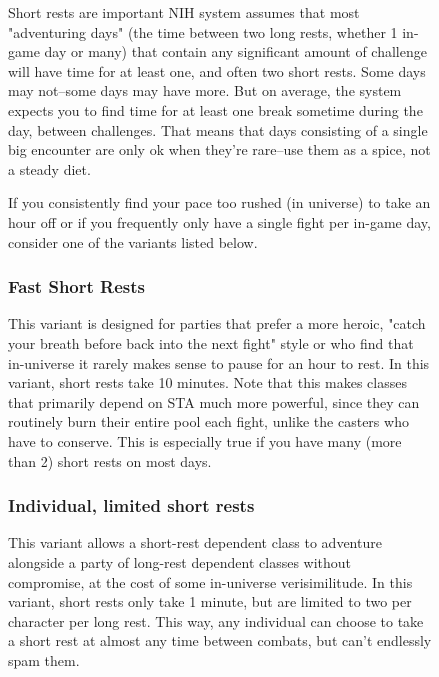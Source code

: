 \begin{figure}
    \begin{DndSidebar}{Short rests are important}
        NIH system assumes that most "adventuring days" (the time between two long rests, whether 1 in-game day or many) that contain any significant amount of challenge will have time for at least one, and often two short rests. Some days may not--some days may have more. But on average, the system expects you to find time for at least one break sometime during the day, between challenges. That means that days consisting of a single big encounter are only ok when they're rare--use them as a spice, not a steady diet.

        If you consistently find your pace too rushed (in universe) to take an hour off or if you frequently only have a single fight per in-game day, consider one of the variants listed below.
        \subsubsection{Fast Short Rests}

        This variant is designed for parties that prefer a more heroic, "catch your breath before back into the next fight" style or who find that in-universe it rarely makes sense to pause for an hour to rest. In this variant, short rests take 10 minutes. Note that this makes classes that primarily depend on STA much more powerful, since they can routinely burn their entire pool each fight, unlike the casters who have to conserve. This is especially true if you have many (more than 2) short rests on most days.

        \subsubsection{Individual, limited short rests}
        This variant allows a short-rest dependent class to adventure alongside a party of long-rest dependent classes without compromise, at the cost of some in-universe verisimilitude. In this variant, short rests only take 1 minute, but are limited to two per character per long rest. This way, any individual can choose to take a short rest at almost any time between combats, but can't endlessly spam them.


\end{DndSidebar}
\end{figure}
